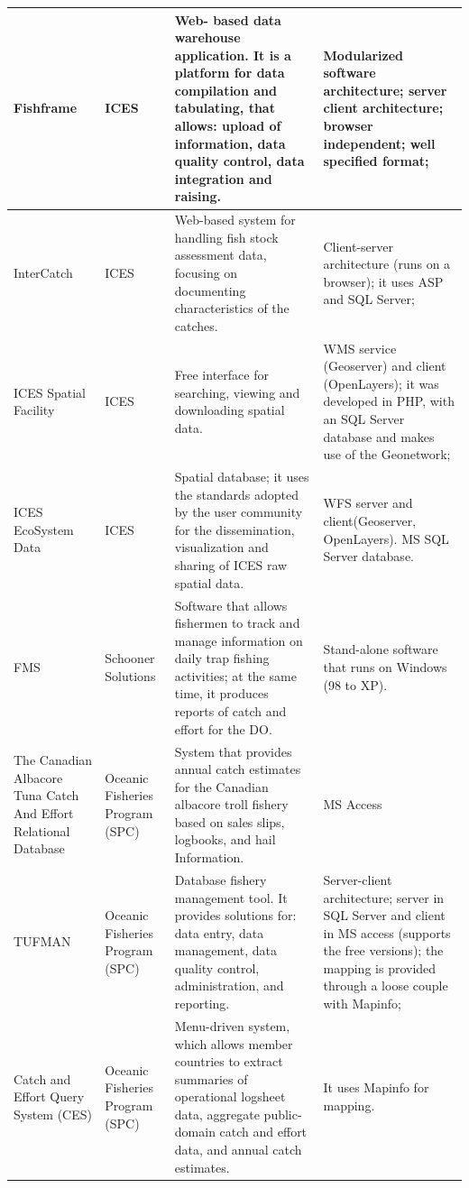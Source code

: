 \documentclass[11pt]{article} %
\begin{document}
\begin{center}
\begin{supertabular}{ | p{0.2\textwidth} | p{0.2\textwidth} | p{0.2\textwidth} | p{0.2\textwidth} |}
Fishframe & ICES & Web- based data warehouse application. It is a platform for data compilation and tabulating, that allows: upload of information, data quality control, data integration and raising. & Modularized software architecture; server client architecture; browser independent; well specified format; \\ \hline
InterCatch & ICES & Web-based system for handling fish stock assessment data, focusing on documenting characteristics of the catches.  & Client-server architecture (runs on a browser); it uses ASP and SQL Server; \\ \hline
ICES Spatial Facility & ICES & Free interface for searching, viewing and downloading spatial data. & WMS service (Geoserver) and client (OpenLayers); it was developed in PHP, with an SQL Server database and makes use of the Geonetwork; \\ \hline
ICES EcoSystem Data & ICES & Spatial database; it uses the standards adopted by the user community for the dissemination, visualization and sharing of ICES raw spatial data. & WFS server and client(Geoserver, OpenLayers). MS SQL Server database. \\ \hline
FMS & Schooner Solutions & Software that allows fishermen to track and manage information on daily trap fishing activities; at the same time, it produces reports of catch and effort for the DO. & Stand-alone software that runs on Windows (98 to XP). \\ \hline
The Canadian Albacore Tuna Catch And Effort Relational Database & Oceanic Fisheries Program (SPC) & System that provides annual catch estimates for the Canadian albacore troll fishery based on sales slips, logbooks, and hail Information. & MS Access \\ \hline
TUFMAN & Oceanic Fisheries Program (SPC) & Database fishery management tool. It provides solutions for: data entry, data management, data quality control, administration, and reporting. & Server-client architecture; server in SQL Server and client in MS access (supports the free versions); the mapping is provided through a loose couple with Mapinfo; \\ \hline
Catch and Effort Query System (CES) & Oceanic Fisheries Program (SPC) & Menu-driven system, which allows member countries to extract summaries of operational logsheet data, aggregate public-domain catch and effort data, and annual catch estimates. & It uses Mapinfo for mapping. \\ \hline

\end{supertabular}
\end{center}
\end{document}
